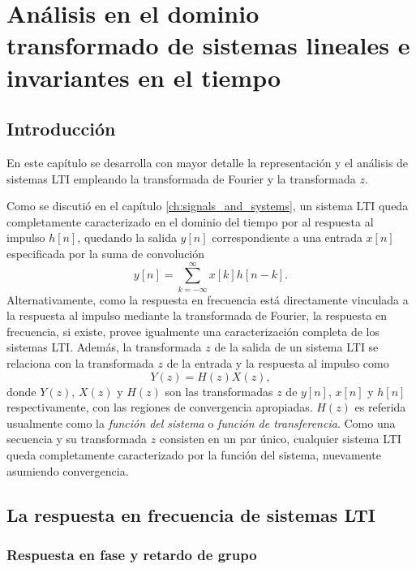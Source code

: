 \documentclass[a4paper]{report}
\begin{document}
\chapter{Análisis en el dominio transformado de sistemas lineales e invariantes en el tiempo}

\section{Introducción}

En este capítulo se desarrolla con mayor detalle la representación y el análisis de sistemas LTI empleando la transformada de Fourier y la transformada \(z\).

Como se discutió en el capítulo \ref{ch:signals_and_systems}, un sistema LTI queda completamente caracterizado en el dominio del tiempo por al respuesta al impulso \(h[n]\), quedando la salida \(y[n]\) correspondiente a una entrada \(x[n]\) especificada por la suma de convolución
\[
 y[n]=\sum_{k=-\infty}^\infty x[k]h[n-k].
\]
Alternativamente, como la respuesta en frecuencia está directamente vinculada a la respuesta al impulso mediante la transformada de Fourier, la respuesta en frecuencia, si existe, provee igualmente una caracterización completa de los sistemas LTI. Además, la transformada \(z\) de la salida de un sistema LTI se relaciona con la transformada \(z\) de la entrada y la respuesta al impulso como
\begin{equation}\label{eq:transform_analysis_input_output_system_function_lti}
 Y(z)=H(z)X(z), 
\end{equation}
donde \(Y(z)\), \(X(z)\) y \(H(z)\) son las transformadas \(z\) de \(y[n]\), \(x[n]\) y \(h[n]\) respectivamente, con las regiones de convergencia apropiadas. \(H(z)\) es referida usualmente como la \emph{función del sistema} o \emph{función de transferencia}. Como una secuencia y su transformada \(z\) consisten en un par único, cualquier sistema LTI queda completamente caracterizado por la función del sistema, nuevamente asumiendo convergencia.

\section{La respuesta en frecuencia de sistemas LTI}\label{sec:transform_analysis_frequency_response_lti}

\subsection{Respuesta en fase y retardo de grupo}
\end{document}
